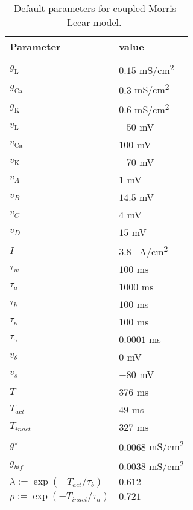 \documentclass[utf8]{frontiers_suppmat} %
\renewcommand{\k}{\mathrm{K}}
\newcommand{\ca}{\mathrm{Ca}}
\newcommand{\leak}{\mathrm{L}}
\begin{document}
\begin{table}[h]
	\caption{Default parameters for coupled Morris-Lecar model.~\label{tab:pars}}
	\centering
	\begin{tabular}{ll}
		Parameter                        & value                 \\
		\hline
		                                 &                       \\
		$g_{\leak}$                      & $0.15$ \si{mS/cm^2}   \\
		$g_{\ca}$                        & $0.3$ \si{mS/cm^2}    \\
		$g_{\k}$                         & $0.6$ \si{mS/cm^2}    \\
		$v_{\leak}$                      & $-50$ \si{mV}         \\
		$v_{\ca}$                        & $100$ \si{mV}         \\
		$v_{\k}$                         & $-70$ \si{mV}         \\
		$v_{A}$                          & $1$ \si{mV}           \\
		$v_{B}$                          & $14.5$ \si{mV}        \\
		$v_{C}$                          & $4$ \si{mV}           \\
		$v_{D}$                          & $15$ \si{mV}          \\
		$I$                              & $3.8$ \si{\mu A/cm^2} \\
		$\tau_w$                         & $100$ \si{ms}         \\
		$\tau_a$                         & $1000$ \si{ms}        \\
		$\tau_b$                         & $100$ \si{ms}         \\
		$\tau_\kappa$                    & $100$ \si{ms}         \\
		$\tau_\gamma$                    & $0.0001$ \si{ms}      \\
		$v_{\theta}$                     & $0$ \si{mV}           \\
		$v_{s}$                          & $-80$ \si{mV}         \\
		$T$                              & $376$ \si{ms}         \\
		$T_{act}$                        & $49$ \si{ms}          \\
		$T_{inact}$                      & $327$ \si{ms}         \\
		$g^{\star}$                         & $0.0068$ \si{mS/cm^2} \\
		$g_{bif}$                         & $0.0038$ \si{mS/cm^2} \\
		$\lambda:=\exp(-T_{act}/\tau_b)$ & $0.612$               \\
		$\rho:=\exp(-T_{inact}/\tau_a)$  & $0.721$               \\
	\end{tabular}
\end{table}
\end{document}
